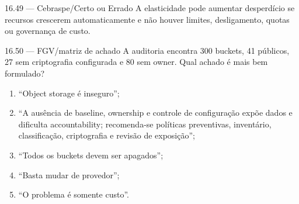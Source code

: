 \begin{questao}{ 16.49 — Cebraspe/Certo ou Errado}
A elasticidade pode aumentar desperdício se recursos crescerem automaticamente e não houver limites, desligamento, quotas ou governança de custo.
\end{questao}

\begin{questao}{ 16.50 — FGV/matriz de achado}
A auditoria encontra 300 buckets, 41 públicos, 27 sem criptografia configurada e 80 sem owner. Qual achado é mais bem formulado?
\begin{enumerate}[label=\Alph*)]
\item ``Object storage é inseguro'';
\item ``A ausência de baseline, ownership e controle de configuração expõe dados e dificulta accountability; recomenda-se políticas preventivas, inventário, classificação, criptografia e revisão de exposição'';
\item ``Todos os buckets devem ser apagados'';
\item ``Basta mudar de provedor'';
\item ``O problema é somente custo''.
\end{enumerate}
\end{questao}
